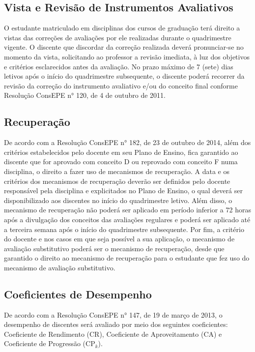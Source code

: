 \subsection{Vista e Revisão de Instrumentos Avaliativos}
O estudante matriculado em disciplinas dos cursos de graduação terá direito a
vistas das correções de avaliações por ele realizadas durante o quadrimestre vigente. O
discente que discordar da correção realizada deverá pronunciar-se no momento da
vista, solicitando ao professor a revisão imediata, à luz dos objetivos e critérios
esclarecidos antes da avaliação. No prazo máximo de 7 (sete) dias letivos após o início
do quadrimestre subsequente, o discente poderá recorrer da revisão da correção do
instrumento avaliativo e/ou do conceito final conforme Resolução ConsEPE n° 120, de
4 de outubro de 2011.

\subsection{Recuperação}
De acordo com a Resolução ConsEPE n° 182, de 23 de outubro de 2014, além dos
critérios estabelecidos pelo docente em seu Plano de Ensino, fica garantido ao discente
que for aprovado com conceito D ou reprovado com conceito F numa disciplina, o
direito a fazer uso de mecanismos de recuperação.
A data e os critérios dos mecanismos de recuperação deverão ser definidos pelo
docente responsável pela disciplina e explicitados no Plano de Ensino, o qual deverá
ser disponibilizado aos discentes no início do quadrimestre letivo. Além disso, o
mecanismo de recuperação não poderá ser aplicado em período inferior a 72 horas
após a divulgação dos conceitos das avaliações regulares e poderá ser aplicado até a
terceira semana após o início do quadrimestre subsequente.
Por fim, a critério do docente e nos casos em que seja possível a sua aplicação, o
mecanismo de avaliação substitutivo poderá ser o mecanismo de recuperação, desde
que garantido o direito ao mecanismo de recuperação para o estudante que fez uso do
mecanismo de avaliação substitutivo.

\subsection{Coeficientes de Desempenho}

\newcommand{\cpk}{CP$_k$\xspace}

De acordo com a Resolução ConsEPE n° 147, de 19 de março de 2013, o
desempenho de discentes será avaliado por meio dos seguintes coeficientes:
Coeficiente de Rendimento (CR), Coeficiente de Aproveitamento (CA) e Coeficiente de
Progressão (\cpk).

